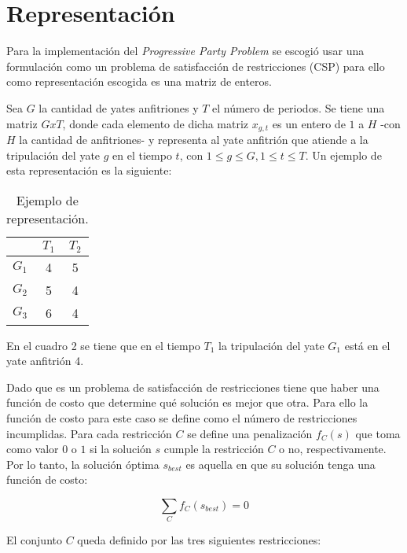 \documentclass[letter, 10pt]{article}
\begin{document}
\section{Representaci\'on}

Para la implementación del \textit{Progressive Party Problem} se escogió usar una formulación como un problema de satisfacción de restricciones (CSP) para ello como representación escogida es una matriz de enteros.

Sea $G$ la cantidad de yates anfitriones y $T$ el número de periodos. Se tiene una matriz $GxT$, donde cada elemento de dicha matriz $x_{g,t}$ es un entero de $1$ a $H$ -con $H$ la cantidad de anfitriones- y representa al yate anfitrión que atiende a la tripulación del yate $g$ en el tiempo $t$, con $1\leq g \leq G, 1\leq t \leq T$. Un ejemplo de esta representación es la siguiente:

\begin{table}[H]
\centering
\label{repre}
\begin{tabular}{c|c|c|}
\cline{2-3}
                           & $T_1$ & $T_2$ \\ \hline
\multicolumn{1}{|l|}{$G_1$} & 4    & 5    \\ \hline
\multicolumn{1}{|l|}{$G_2$} & 5    & 4    \\ \hline
\multicolumn{1}{|l|}{$G_3$} & 6    & 4    \\ \hline
\end{tabular}
\caption{Ejemplo de representación.}
\end{table}

En el cuadro 2 se tiene que en el tiempo $T_1$ la tripulación del yate $G_1$ está en el yate anfitrión 4.

Dado que es un problema de satisfacción de restricciones tiene que haber una función de costo que determine qué solución es mejor que otra. Para ello la función de costo para este caso se define como el número de restricciones incumplidas. Para cada restricción $C$ se define una penalización $f_C(s)$ que toma como valor $0$ o $1$ si la solución $s$ cumple la restricción $C$ o no, respectivamente. Por lo tanto, la solución óptima $s_{best}$ es aquella en que su solución tenga una función de costo:

\begin{equation}
    \sum_C f_C(s_{best})=0
\end{equation}

El conjunto $C$ queda definido por las tres siguientes restricciones:
\end{document}

